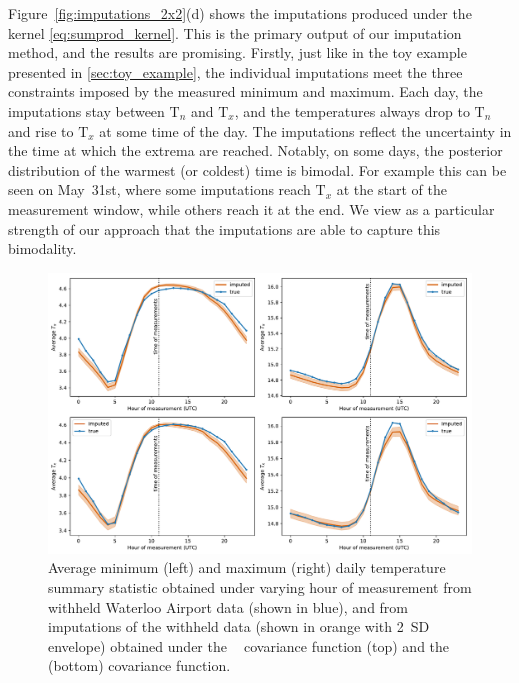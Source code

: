 \documentclass[letter]{article}
\makeatletter
\def\maxwidth{\ifdim\Gin@nat@width>\linewidth\linewidth
\else\Gin@nat@width\fi}
\let\Oldincludegraphics\includegraphics
\renewcommand{\includegraphics}[1]{\Oldincludegraphics[width=0.98\maxwidth]{#1}}
\newcommand{\T}{\mathrm{T}}
\newcommand{\Tn}{\T_{n}}
\newcommand{\Tx}{\T_{x}}
\DeclareMathOperator{\kSESE}{k_{\mathtt{SExSE}}}
\DeclareMathOperator{\ksumprod}{k_{\mathtt{sumprod}}}
\makeatother
\begin{document}
        Figure~\ref{fig:imputations_2x2}(d) shows the imputations produced under the \(\ksumprod\) kernel \eqref{eq:sumprod_kernel}.
This is the primary output of our imputation method, and the results are promising.
Firstly, just like in the toy example presented in \ref{sec:toy_example}, the individual imputations meet the three constraints imposed by the measured minimum and maximum.
Each day, the imputations stay between \(\Tn\) and \(\Tx\),
and the temperatures always drop to \(\Tn\) and rise to \(\Tx\) at some time of the day.
The imputations reflect the uncertainty in the time at which the extrema are reached.
Notably, on some days, the posterior distribution of the warmest (or coldest) time is bimodal.
For example this can be seen on May~31st, where some imputations reach \(\Tx\) at the start of the measurement window, while others reach it at the end.
We view as a particular strength of our approach that the imputations are able to capture this bimodality.
    


        \begin{figure}
\centering
\includegraphics{../figures/imputed_summary_stats.pdf}
\caption{\label{fig:imputed_summary_stats}Average minimum (left) and maximum (right) daily temperature summary statistic obtained under varying hour of measurement from withheld Waterloo Airport data (shown in blue), and from imputations of the withheld data (shown in orange with 2~SD envelope) obtained under the $\kSESE$ covariance function (top) and the \(\ksumprod\) (bottom) covariance function.}
\end{figure}
    
\end{document}
